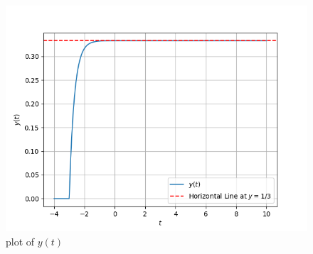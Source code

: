 \documentclass[journal,12pt,twocolumn]{IEEEtran}
\theoremstyle{remark}
\begin{document}
\begin{figure}[h!]
    \centering
    \includegraphics[width=0.8\columnwidth]{2021/IN/43/figs/plot.png}
    \caption{plot of $y(t)$}
    \label{fig:gate202138fig}
\end{figure}
\end{document}
